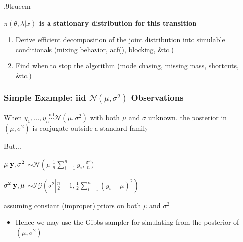 \begin{slide}
\pause
\vglue .9truecm
\centerline{{\bf $\pi(\theta,\lambda|x)$ is
a stationary distribution for this transition}}

\end{slide}\begin{slide}

\begin{enumerate}
\item Derive efficient decomposition of the joint distribution into simulable conditionals
(mixing behavior, {\sf acf()}, blocking, \&tc.)

\pause\vs
\item Find when to stop the algorithm
(mode chasing, missing mass, shortcuts, \&tc.)

\end{enumerate}

\end{slide}\begin{frame}
\frametitle{Simple Example: iid
$\mathscr{N}(\mu,\sigma^2)$ Observations}
  When $y_1,\ldots,y_n \stackrel{\text{iid}}{\sim}
  \mathscr{N}(\mu,\sigma^2)$ with both $\mu$ and $\sigma$ unknown, the posterior in
  $(\mu, \sigma^2)$ is conjugate outside a standard family

\pause
\begin{block}{But...}
\begin{description}
\item $\mu|\mathbf{y},\sigma^2$ $\sim \mathscr{N}\left(\mu\left|\frac{1}{n}
	\sum_{i=1}^n y_i, \frac{\sigma^2}{n}\right.\right.)$
\item $\sigma^2|\mathbf{y},\mu$ $\sim \mathscr{IG}\left(\sigma^2 \left|\frac{n}{2}-1,
	\frac{1}{2}\sum_{i=1}^n (y_i-\mu)^2 \right.\right)$
\end{description}
assuming constant (improper) priors on both $\mu$ and $\sigma^2$
\end{block}
\begin{itemize}
\item Hence we may use the Gibbs sampler for simulating from the posterior
      of $(\mu,\sigma^2)$
\end{itemize}

\end{frame}

